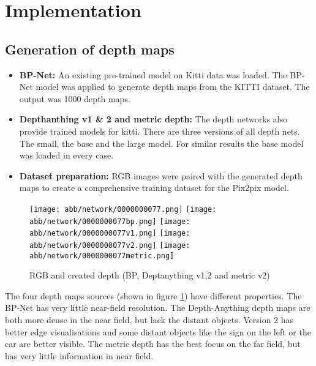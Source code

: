 \section{Implementation}
\subsection{Generation of depth maps}
\begin{itemize}
	\item \textbf{BP-Net:} An existing pre-trained model on Kitti data was loaded. The BP-Net model was applied to generate depth maps from the KITTI dataset. The output was 1000 depth maps.
	
	\item \textbf{Depthanthing v1 \& 2 and metric depth:} The depth networks also provide trained models for kitti. There are three versions of all depth nets. The small, the base and the large model. For similar results the base model was loaded in every case.   
	
	\item \textbf{Dataset preparation:} RGB images were paired with the generated depth maps to create a comprehensive training dataset for the Pix2pix model.
	\end{itemize}
\begin{figure}[!ht]
	\centering
	\texttt{[image: abb/network/0000000077.png]}
	\texttt{[image: abb/network/0000000077bp.png]}
	\texttt{[image: abb/network/0000000077v1.png]}
	\texttt{[image: abb/network/0000000077v2.png]}
	\texttt{[image: abb/network/0000000077metric.png]}
	\caption{RGB and created depth (BP, Deptanything v1,2 and metric v2)}
	\label{all_depths}
\end{figure}
The four depth maps sources (shown in figure \ref{all_depths}) have different properties. The BP-Net has very little near-field resolution. The Depth-Anything depth maps are both more dense in the near field, but lack the distant objects. Version 2 has better edge visualisations and some distant objects like the sign on the left or the car are better visible. The metric depth has the best focus on the far field, but has very little  information in near field. 

\newpage
